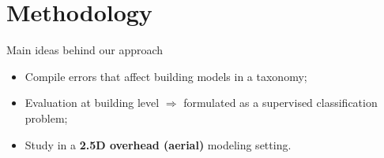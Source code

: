 \documentclass[10pt, export]{beamer}
\begin{document}
    \section{Methodology}
            \begin{frame}{Main ideas behind our approach}
                \begin{itemize}[label=$\blacktriangleright$, font=\color{IGNGreen}, itemsep=2em]
                    \item<1-> Compile errors that affect building models in a taxonomy;
                    \item<2-> Evaluation at building level $\Longrightarrow$ formulated as a supervised classification problem;
                    \item<3-> Study in a \textbf{2.5D overhead (aerial)} modeling setting.
                \end{itemize}
            \end{frame}
\end{document}
